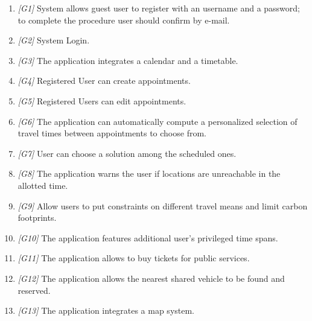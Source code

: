 \begin{enumerate}
	\item \textit{[G1]} 
		System allows guest user to register with an username and a password; to complete the procedure user should confirm by e-mail.
	\item \textit{[G2]} System Login.
	\item \textit{[G3]} The application integrates a calendar and a timetable.
	\item \textit{[G4]} Registered User can create appointments. 
	\item \textit{[G5]} Registered Users can edit appointments.
	\item \textit{[G6]} The application can automatically compute a personalized selection of travel times between appointments to choose from.
	\item \textit{[G7]} User can choose a solution among the scheduled ones.
	\item \textit{[G8]} The application warns the user if locations are unreachable in the allotted time.
	\item \textit{[G9]} Allow users to put constraints on different travel means and limit carbon footprints.
	\item \textit{[G10]} The application features additional user’s privileged time spans.
	\item \textit{[G11]} The application allows to buy tickets for public services.
	\item \textit{[G12]} The application allows the nearest shared vehicle to be found and reserved.
	\item \textit{[G13]} The application integrates a map system.
		
\end{enumerate}	

